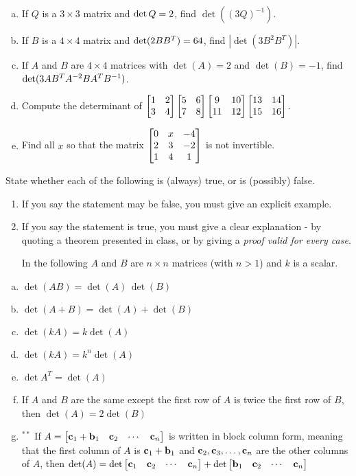 \begin{prob}
\begin{enumerate}[a)]
\item If $Q$ is a $3\times 3$ matrix and $\hbox{det}\,Q=2$, find $\det((3Q)^{-1})$.
\medskip
\item\sov If $B$ is a $4\times 4$ matrix and $\hbox{det}(2BB^T)=64$, find $|\det(3B^2B^T)|$.
\medskip
%
\item If $A$ and $B$ are $4\times 4$ matrices with $\det(A)=2$
and $\det(B)=-1$, find $\hbox{det}(3AB^TA^{-2}BA^TB^{-1})$.
\medskip
%
\item\sov Compute the determinant of
$\bmatrix 1&2\cr3&4 \endbmatrix\bmatrix 5&6\cr7&8\endbmatrix 
\bmatrix9&10\cr11&12\endbmatrix\bmatrix 13&14\cr15&16\endbmatrix.$
\medskip
\item  Find all $x$ so that the matrix $\bmatrix 0&x&-
4\cr2&3&-2\cr1&4&1\endbmatrix$ is not invertible.
\medskip
\end{enumerate}
\end{prob} \begin{prob} \label{prob21.4} State whether each of the following is (always) true,
or is (possibly) false.    
   \smallskip    
\begin{enumerate}[$\bullet$]
\item If you say the statement may be false, you must give an explicit example.   
\item If you say the statement is true, you must give a clear explanation -   by quoting a theorem presented in class, or by giving a {\it proof valid for every  case}. 

\medskip In the following $A$ and $B$ are $n\times n$ matrices (with $n>1$) and $k$ is a scalar.
\end{enumerate}
\medskip
\begin{enumerate}[a)]
\item $\det (AB) = \det(A) \, \det(B)$
\medskip
%
\item\sov $\det (A +B) = \det(A) +\det(B)$
\medskip
%
\item $\det (k A)= k \det(A)$
\medskip
%
\item\sov $\det (k A)= k^n \det(A)$
\medskip
%
\item $\det  A^T = \det(A)$
\medskip
%
\item\sov If $A$ and $B$ are the same except the first row of $A$ is twice the first row of $B$, then $\det(A)=2 \det(B)$
\medskip
%
\item$^{\ast\ast}$ If $A=\bmatrix \cc_1 +\bb_1 & \cc_2 & \cdots& \cc_n \endbmatrix$ is written in block column form, meaning that the first column of $A$ is $\mathbf{c}_1 +\mathbf{b}_1$ and $\mathbf{c}_2, \mathbf{c}_3, \dots, \mathbf{c}_n$ are the other columns of $A$, then $\det(A)=   \det \bmatrix \cc_1  & \cc_2 & \cdots& \cc_n \endbmatrix + \det \bmatrix  \bb_1 & \cc_2 & \cdots& \cc_n \endbmatrix $ 
\medskip
%


\end{enumerate}
\end{prob}
